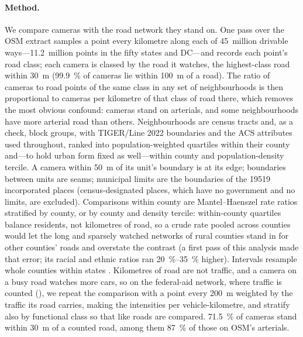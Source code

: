\documentclass[11pt,twoside]{article}
\begin{document}
\paragraph{Method.} We compare cameras with the road network they stand on. One pass over the
OSM extract samples a point every kilometre along each of 45~million drivable ways---\num{11.2}~million
points in the fifty states and DC---and records each point's road class; each camera is classed
by the road it watches, the highest-class road within \SI{30}{\metre} (\SI{99.9}{\percent} of
cameras lie within \SI{100}{\metre} of a road). The ratio of cameras to road points of the same
class in any set of neighbourhoods is then proportional to cameras per kilometre of that class
of road there, which removes the most obvious confound: cameras stand on arterials, and some
neighbourhoods have more arterial road than others. Neighbourhoods are census tracts and, as a
check, block groups, with TIGER/Line 2022 boundaries \citep{tiger2022} and the ACS attributes used throughout, ranked into population-weighted
quartiles within their county and---to hold urban form fixed as well---within county and
population-density tercile. A camera within \SI{50}{\metre} of its unit's boundary is at its
edge; boundaries between units are seams; municipal limits are the boundaries of the
\num{19519} incorporated places (census-designated places, which have no government and no
limits, are excluded). Comparisons within county are Mantel--Haenszel rate ratios \citep{mantel1959} stratified by
county, or by county and density tercile: within-county quartiles balance residents, not
kilometres of road, so a crude rate pooled across counties would let the long and sparsely
watched networks of rural counties stand in for other counties' roads and overstate the
contrast (a first pass of this analysis made that error; its racial and ethnic ratios ran
\SIrange{20}{35}{\percent} higher). Intervals resample whole counties within states \citep{field2007}. Kilometres of road are not traffic,
and a camera on a busy road watches more cars, so on the federal-aid network, where traffic is
counted (), we repeat the comparison with a point every
\SI{200}{\metre} weighted by the traffic its road carries, making the intensities per
vehicle-kilometre, and stratify also by functional class so that like roads are compared.
\SI{71.5}{\percent} of cameras stand within \SI{30}{\metre} of a counted road, among them
\SI{87}{\percent} of those on OSM's arterials.
\end{document}
